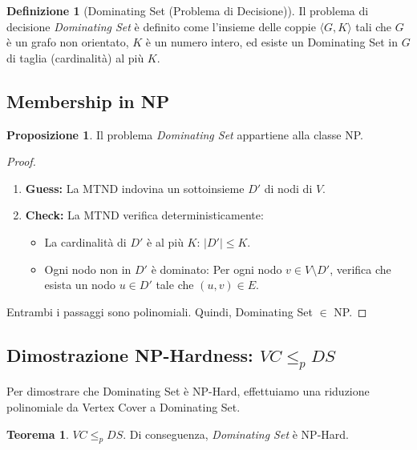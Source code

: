 \documentclass[a4paper]{article}
\theoremstyle{definition} %
\newtheorem{theorem}{Teorema}
[section]
\newtheorem{definition}{Definizione}[section]
\newtheorem{proposition}{Proposizione}[section]
\theoremstyle{definition} %
\begin{document}
\begin{definition}[Dominating Set (Problema di Decisione)]
Il problema di decisione \emph{Dominating Set} è definito come l'insieme delle coppie $\langle G, K \rangle$ tali che $G$ è un grafo non orientato, $K$ è un numero intero, ed esiste un Dominating Set in $G$ di taglia (cardinalità) al più $K$.
\end{definition}

\subsection{Membership in NP}

\begin{proposition}
Il problema \emph{Dominating Set} appartiene alla classe NP.
\end{proposition}

\begin{proof}
\begin{enumerate}
    \item \textbf{Guess:} La MTND indovina un sottoinsieme $D'$ di nodi di $V$.
    \item \textbf{Check:} La MTND verifica deterministicamente:
    \begin{itemize}
        \item La cardinalità di $D'$ è al più $K$: $|D'| \le K$.
        \item Ogni nodo non in $D'$ è dominato: Per ogni nodo $v \in V \setminus D'$, verifica che esista un nodo $u \in D'$ tale che $(u, v) \in E$.
    \end{itemize}
\end{enumerate}
Entrambi i passaggi sono polinomiali. Quindi, Dominating Set $\in$ NP.
\end{proof}

\subsection{Dimostrazione NP-Hardness: $VC \le_p DS$}

Per dimostrare che Dominating Set è NP-Hard, effettuiamo una riduzione polinomiale da Vertex Cover a Dominating Set.

\begin{theorem}
$VC \le_p DS$. Di conseguenza, \emph{Dominating Set} è NP-Hard.
\end{theorem}
\end{document}
